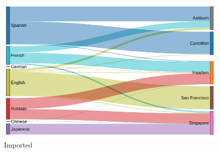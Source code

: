 \begin{figure}\centering
    \includegraphics[scale=0.5]{main-chapters/images/lang_dc_sankey.png}
    \caption[Short caption, to appear in the table of contents]{Imported}
    \label{LabelForTheImage}
    \end{figure}